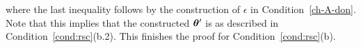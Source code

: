 where the last inequality follows by the construction of $\epsilon$ in Condition~\eqref{ch-A-don}. Note that this implies that the constructed ${\bm{\theta}}'$ is as described in Condition~\ref{cond:rsc}(b.2). This finishes the proof for Condition~\ref{cond:rsc}(b).







